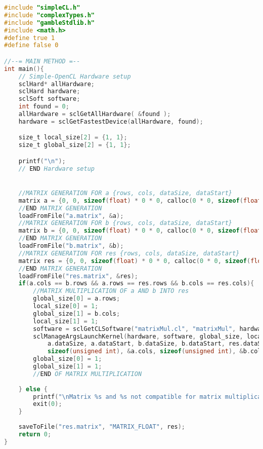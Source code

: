 \begin{lstlisting}[language=C,caption={C-code for matrix multiplication using the GPU, compiled from \gls{gamble} sourcecode.},frame=tlrb]
#include "simpleCL.h"
#include "complexTypes.h"
#include "gambleStdlib.h"
#include <math.h>
#define true 1
#define false 0

//--= MAIN METHOD =--
int main(){
    // Simple-OpenCL Hardware setup
    sclHard* allHardware;
    sclHard hardware;
    sclSoft software;
    int found = 0;
    allHardware = sclGetAllHardware( &found );
    hardware = sclGetFastestDevice(allHardware, found);

    size_t local_size[2] = {1, 1};
    size_t global_size[2] = {1, 1};

    printf("\n");
    // END Hardware setup


    //MATRIX GENERATION FOR a {rows, cols, dataSize, dataStart}
    matrix a = {0, 0, sizeof(float) * 0 * 0, calloc(0 * 0, sizeof(float))};
    //END MATRIX GENERATION
    loadFromFile("a.matrix", &a);
    //MATRIX GENERATION FOR b {rows, cols, dataSize, dataStart}
    matrix b = {0, 0, sizeof(float) * 0 * 0, calloc(0 * 0, sizeof(float))};
    //END MATRIX GENERATION
    loadFromFile("b.matrix", &b);
    //MATRIX GENERATION FOR res {rows, cols, dataSize, dataStart}
    matrix res = {0, 0, sizeof(float) * 0 * 0, calloc(0 * 0, sizeof(float))};
    //END MATRIX GENERATION
    loadFromFile("res.matrix", &res);
    if(a.cols == b.rows && a.rows == res.rows && b.cols == res.cols){
        //MATRIX MULTIPLICATION OF a AND b INTO res
        global_size[0] = a.rows;
        local_size[0] = 1;
        global_size[1] = b.cols;
        local_size[1] = 1;
        software = sclGetCLSoftware("matrixMul.cl", "matrixMul", hardware);
        sclManageArgsLaunchKernel(hardware, software, global_size, local_size, "%r %r %R %a %a",
            a.dataSize, a.dataStart, b.dataSize, b.dataStart, res.dataSize, res.dataStart,
            sizeof(unsigned int), &a.cols, sizeof(unsigned int), &b.cols);
        global_size[0] = 1;
        global_size[1] = 1;
        //END OF MATRIX MULTIPLICATION
        
    } else {
        printf("\nMatrix %s and %s not compatible for matrix multiplication into %s \n", "a", "b", "res");
        exit(0);
    }
    
    saveToFile("res.matrix", "MATRIX_FLOAT", res);
    return 0;
}
\end{lstlisting}

